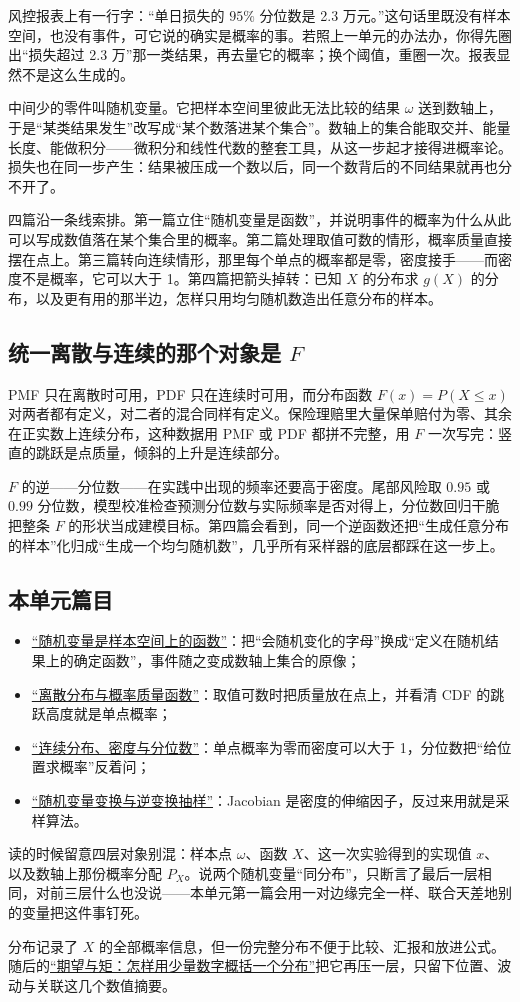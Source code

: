 风控报表上有一行字：``单日损失的 \(95\%\) 分位数是 2.3 万元。''这句话里既没有样本空间，也没有事件，可它说的确实是概率的事。若照上一单元的办法办，你得先圈出``损失超过 2.3 万''那一类结果，再去量它的概率；换个阈值，重圈一次。报表显然不是这么生成的。

中间少的零件叫随机变量。它把样本空间里彼此无法比较的结果 \(\omega\) 送到数轴上，于是``某类结果发生''改写成``某个数落进某个集合''。数轴上的集合能取交并、能量长度、能做积分——微积分和线性代数的整套工具，从这一步起才接得进概率论。损失也在同一步产生：结果被压成一个数以后，同一个数背后的不同结果就再也分不开了。

四篇沿一条线索排。第一篇立住``随机变量是函数''，并说明事件的概率为什么从此可以写成数值落在某个集合里的概率。第二篇处理取值可数的情形，概率质量直接摆在点上。第三篇转向连续情形，那里每个单点的概率都是零，密度接手——而密度不是概率，它可以大于 1。第四篇把箭头掉转：已知 \(X\) 的分布求 \(g(X)\) 的分布，以及更有用的那半边，怎样只用均匀随机数造出任意分布的样本。

\subsection{\texorpdfstring{统一离散与连续的那个对象是 \(F\)}{统一离散与连续的那个对象是 F}}

PMF 只在离散时可用，PDF 只在连续时可用，而分布函数 \(F(x)=P(X\le x)\) 对两者都有定义，对二者的混合同样有定义。保险理赔里大量保单赔付为零、其余在正实数上连续分布，这种数据用 PMF 或 PDF 都拼不完整，用 \(F\) 一次写完：竖直的跳跃是点质量，倾斜的上升是连续部分。

\(F\) 的逆——分位数——在实践中出现的频率还要高于密度。尾部风险取 \(0.95\) 或 \(0.99\) 分位数，模型校准检查预测分位数与实际频率是否对得上，分位数回归干脆把整条 \(F\) 的形状当成建模目标。第四篇会看到，同一个逆函数还把``生成任意分布的样本''化归成``生成一个均匀随机数''，几乎所有采样器的底层都踩在这一步上。

\subsection{本单元篇目}

\begin{itemize}
\tightlist
\item \hyperref[sec:05-Probability/03-Random-Variables/01]{``随机变量是样本空间上的函数''}：把``会随机变化的字母''换成``定义在随机结果上的确定函数''，事件随之变成数轴上集合的原像；
\item \hyperref[sec:05-Probability/03-Random-Variables/02]{``离散分布与概率质量函数''}：取值可数时把质量放在点上，并看清 CDF 的跳跃高度就是单点概率；
\item \hyperref[sec:05-Probability/03-Random-Variables/03]{``连续分布、密度与分位数''}：单点概率为零而密度可以大于 1，分位数把``给位置求概率''反着问；
\item \hyperref[sec:05-Probability/03-Random-Variables/04]{``随机变量变换与逆变换抽样''}：Jacobian 是密度的伸缩因子，反过来用就是采样算法。
\end{itemize}

读的时候留意四层对象别混：样本点 \(\omega\)、函数 \(X\)、这一次实验得到的实现值 \(x\)、以及数轴上那份概率分配 \(P_X\)。说两个随机变量``同分布''，只断言了最后一层相同，对前三层什么也没说——本单元第一篇会用一对边缘完全一样、联合天差地别的变量把这件事钉死。

分布记录了 \(X\) 的全部概率信息，但一份完整分布不便于比较、汇报和放进公式。随后的\hyperref[ch:040]{``期望与矩：怎样用少量数字概括一个分布''}把它再压一层，只留下位置、波动与关联这几个数值摘要。
